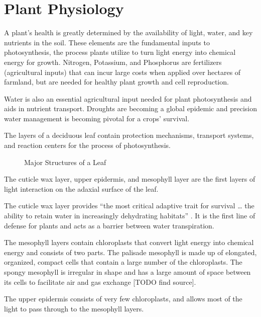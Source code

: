 \section{Plant Physiology}
A plant's health is greatly determined by the availability of light, water, and key nutrients in the soil.  These elements are the fundamental inputs to photosynthesis, the process plants utilize to turn light energy into chemical energy for growth.  Nitrogen, Potassium, and Phosphorus are fertilizers (agricultural inputs) that can incur large costs when applied over hectares of farmland, but are needed for healthy plant growth and cell reproduction.

Water is also an essential agricultural input needed for plant photosynthesis and aids in nutrient transport.  Droughts are becoming a global epidemic and precision water management is becoming pivotal for a crops' survival.

The layers of a deciduous leaf contain protection mechanisms, transport systems, and reaction centers for the process of photosynthesis.

\begin{figure}[!htb]
    \begin{center}
    \end{center}
    \caption{Major Structures of a Leaf}
    \label{fig:polarization}
\end{figure}

The cuticle wax layer, upper epidermis, and mesophyll layer are the first layers of light interaction on the adaxial surface of the leaf.

The cuticle wax layer provides “the most critical adaptive trait for survival … the ability to retain water in increasingly dehydrating habitats” \cite{cuticle}.  It is the first line of defense for plants and acts as a barrier between water transpiration.

The mesophyll layers contain chloroplasts that convert light energy into chemical energy and consists of two parts. The palisade mesophyll is made up of elongated, organized, compact cells that contain a large number of the chloroplasts.  The spongy mesophyll is irregular in shape and has a large amount of space between its cells to facilitate air and gas exchange [TODO find source].

The upper epidermis consists of very few chloroplasts, and allows most of the light to pass through to the mesophyll layers.




